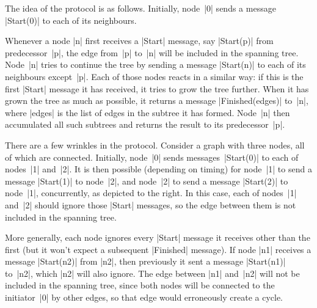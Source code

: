 The idea of the protocol is as follows.  Initially, node~|0| sends a message
|Start(0)| to each of its neighbours.  

Whenever a node |n| first receives a |Start| message, say |Start(p)| from
predecessor~|p|, the edge from~|p| to~|n| will be included in the spanning
tree.  Node~|n| tries to continue the tree by sending a message |Start(n)| to
each of its neighbours except~|p|.  Each of those nodes reacts in a similar
way: if this is the first |Start| message it has received, it tries to grow
the tree further.  When it has grown the tree as much as possible, it returns
a message |Finished(edges)| to~|n|, where |edges| is the list of edges in the
subtree it has formed.  Node~|n| then accumulated all such subtrees and
returns the result to its predecessor~|p|.

\smallskip

\begin{myminipage}{82mm}
There are a few wrinkles in the protocol.  Consider a graph with three nodes,
all of which are connected.  Initially, node~|0| sends messages~|Start(0)| to
each of nodes~|1| and~|2|.  It is then possible (depending on timing) for
node~|1| to send a message |Start(1)| to node~|2|, and node~|2| to send a
message |Start(2)| to node~|1|, concurrently, as depicted to the right.  In
this case, each of nodes~|1| and~|2| should ignore those |Start| messages, so
the edge between them is not included in the spanning tree.
\end{myminipage}
%
\hfill
%
\begin{minipage}{50mm}
\def\labelSize{\footnotesize}
%
\end{minipage}

\smallskip

More generally, each node ignores every |Start| message it receives other than
the first (but it won't expect a subsequent |Finished| message).  If node |n1|
receives a message |Start(n2)| from |n2|, then previously it sent a message
|Start(n1)| to~|n2|, which |n2| will also ignore.  The edge between |n1|
and~|n2| will not be included in the spanning tree, since both nodes will be
connected to the initiator~|0| by other edges, so that edge would erroneously
create a cycle.

